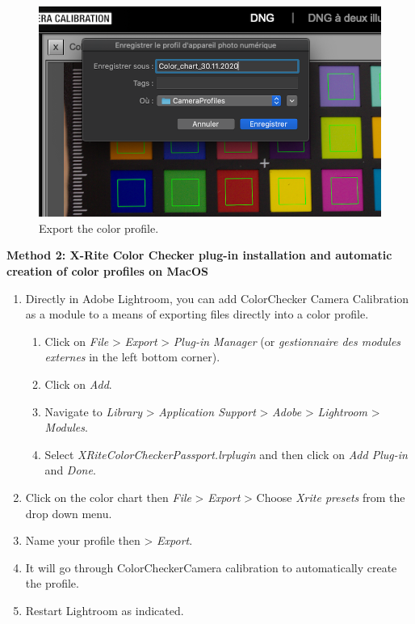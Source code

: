 \documentclass[
]{book}
\begin{document}
\begin{figure}

{\centering \includegraphics[width=0.8\linewidth]{Figures/create_profile} 

}

\caption{Export the color profile.}\label{fig:ColorCheckerprofile}
\end{figure}

\textbf{Method 2: X-Rite Color Checker plug-in installation and automatic creation of color profiles on MacOS}

\begin{enumerate}
\def\labelenumi{\arabic{enumi}.}
\item
  Directly in Adobe Lightroom, you can add ColorChecker Camera
  Calibration as a module to a means of exporting files directly into
  a color profile.

  \begin{enumerate}
  \def\labelenumii{\arabic{enumii}.}
  \item
    Click on \emph{File} \textgreater{} \emph{Export} \textgreater{} \emph{Plug-in Manager} (or \emph{gestionnaire
    des modules externes} in the left bottom corner).
  \item
    Click on \emph{Add}.
  \item
    Navigate to \emph{Library} \textgreater{} \emph{Application Support} \textgreater{} \emph{Adobe} \textgreater{}
    \emph{Lightroom} \textgreater{} \emph{Modules}.
  \item
    Select \emph{XRiteColorCheckerPassport.lrplugin} and then click on
    \emph{Add Plug-in} and \emph{Done}.
  \end{enumerate}
\item
  Click on the color chart then \emph{File} \textgreater{} \emph{Export} \textgreater{} Choose \emph{Xrite
  presets} from the drop down menu.
\item
  Name your profile then \textgreater{} \emph{Export}.
\item
  It will go through ColorCheckerCamera calibration to automatically
  create the profile.
\item
  Restart Lightroom as indicated.
\end{enumerate}
\end{document}
